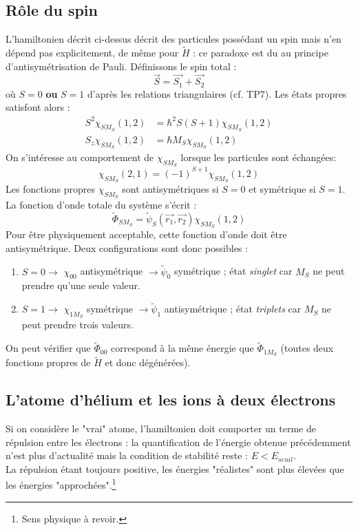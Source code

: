\documentclass[british,french,11pt, a4paper, openany]{book}
\begin{document}
\subsection{Rôle du spin}
L'hamiltonien décrit ci-dessus décrit des particules possédant un spin mais n'en 
dépend pas explicitement, de même pour $\tilde{H}$ : ce paradoxe est du au principe
d'antisymétrisation de Pauli. Définissons le spin total :
\begin{equation}
	\vec{S}=\vec{S_1}+\vec{S_2}
\end{equation}
où $S=0$ \textbf{ou} $S=1$ d'après les relations triangulaires (cf. TP7). Les états 
propres satisfont alors :
\begin{equation}
	\begin{array}{ll}
		S^2\chi_{SM_S}(1,2) & = \hbar^2S(S+1)\chi_{SM_S}(1,2) \\
		S_z\chi_{SM_S}(1,2) & = \hbar M_S\chi_{SM_S}(1,2)     
	\end{array}
\end{equation}
On s'intéresse au comportement de $\chi_{SM_S}$ lorsque les particules sont échangées:
\begin{equation}
	\chi_{SM_S}(2,1) = (-1)^{S+1}\chi_{SM_S}(1,2)
\end{equation}
Les fonctions propres $\chi_{SM_S}$ sont antisymétriques si $S=0$ et symétrique si 
$S=1$. La fonction d'onde totale du système s'écrit :
\begin{equation}
	\tilde{\Phi}_{SM_S} = \tilde{\psi}_S(\vec{r_1},\vec{r_2})\chi_{SM_S}(1,2)
\end{equation}
Pour \^etre physiquement acceptable, cette fonction d'onde doit \^etre antisymétrique.
Deux configurations sont donc possibles :
\begin{enumerate}
	\item $S=0 \rightarrow$ $\chi_{00}$ antisymétrique $\rightarrow \tilde{\psi}_0$ 
	symétrique ; état \textit{singlet} car $M_S$ ne peut prendre qu'une seule valeur.
	\item $S=1 \rightarrow$ $\chi_{1M_S}$ symétrique $\rightarrow \tilde{\psi}_1$ 
	antisymétrique ; état \textit{triplets} car $M_S$ ne peut prendre trois valeurs.
\end{enumerate}
On peut vérifier que $\tilde{\Phi}_{00}$ correspond à la même énergie que $\tilde{
	\Phi}_{1M_S}$ (toutes deux fonctions propres de $\tilde{H}$ et donc dégénérées).


\subsection{L'atome d'hélium et les ions à deux électrons}
Si on considère le "vrai" atome, l'hamiltonien doit comporter un terme de répulsion 
entre les électrons : la quantification de l'énergie obtenue précédemment n'est plus
d'actualité mais la condition de stabilité reste : $E<E_{seuil}$.\\
La répulsion étant toujours positive, les énergies "réalistes" sont plus élevées que 
les énergies "approchées".\footnote{Sens physique à revoir.}
\end{document}
